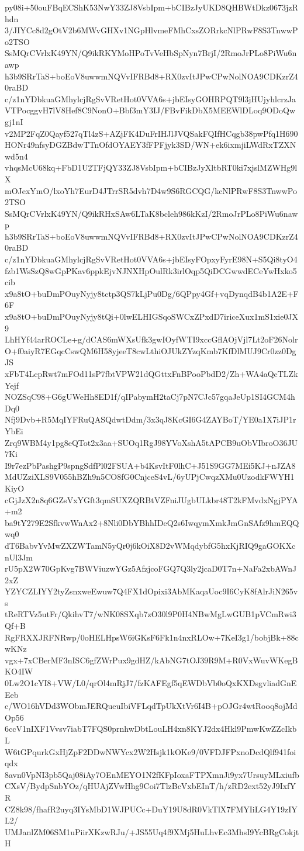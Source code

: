 py08i+50ouFBqECShK53NwY33ZJ8VsbIpm+bCIBzJyUKD8QHBWtDkz0673jzRhdn
3/JIYCc8d2gOtV2b6MWvGHXv1NGpHlvmeFMhCxsZORrkcNlPRwF8S3TnwwPo2TSO
SsMQrCVrlxK49YN/Q9ikRKYMoHPoTvVeHbSpNyn7BrjI/2RmoJrPLo8PiWu6nawp
h3b9SRrTaS+boEoV8uwwmNQVvIFRBd8+RX0zvItJPwCPwNolNOA9CDKzrZ40raBD
c/z1nYDbkuaGMhylcjRgSvVRetHot0VVA6s+jbEIsyGOHRPQT9l3jHUjyhlcrzJa
VTPocggvH7lV8Hef8C9NonO+Bbf3mY3IJ/FBvFikDbX5MEEWlDLoq9ODoQwgj1nI
v2MP2FqZ0Qayf527qTl4zS+AZjFK4DuFrIHJlJVQSakFQIfHCqgb38pwPfq1H690
HONr49nfsyDGZBdwTTnOfdOYAEY3fFPFjyk3SD/WN+ek6ixmjiLWdRxTZXNwd5n4
vhqsMcU68kq+FbD1U2TFjQY33ZJ8VsbIpm+bCIBzJyXltbRT0ki7xjslMZWHg9lX
mOJexYmO/lxoYh7EurD4JTrrSR5dvh7D4w9S6RGCQG/kcNlPRwF8S3TnwwPo2TSO
SsMQrCVrlxK49YN/Q9ikRHxSAw6LTaK8bcleh986kKzI/2RmoJrPLo8PiWu6nawp
h3b9SRrTaS+boEoV8uwwmNQVvIFRBd8+RX0zvItJPwCPwNolNOA9CDKzrZ40raBD
c/z1nYDbkuaGMhylcjRgSvVRetHot0VVA6s+jbEIsyFOpxyFyrE98N+S5Qi8tyO4
fzb1WsSzQ8wGpPKav6ppkEjvNJNXHpOulRk3irlOqp5QiDCGwwdECeYwHxko5cib
x9a8tO+buDmPOuyNyjy8tctp3QS7kLjPu0Dg/6QPpy4Gf+vqDynqdB4b1A2E+F6F
x9a8tO+buDmPOuyNyjy8tQi+0lwELHIGSqoSWCxZPxdD7iriceXux1mS1xie0JX9
LhHYf44arROCLe+g/dCAS6mWXsUfk3gwIOyfWTI9xccGflAOjVjl7Lt2oF26Nolr
O+f0aiyR7EGqcCswQM6H58yjeeT8cwLthiOJUkZYzqKmb7KfDlMUJ9Cr0zz0DgJS
xFbT4LcpRwt7mFOd11sP7fbtVPW21dQGttxFnBPooPbdD2/Zh+WA4aQcTLZkYejf
NOZSqC98+G6gUWeHh8ED1f/qIPabymH2taCj7pN7CJc57gqaJeUp1SI4GCM4hDq0
Nfj9Dvb+R5MqIYFRuQASQdwtDdm/3x3qJ8KcGI6G4ZAYBoT/YE0a1X7iJP1rYbEi
Zrq9WBM4y1pg8eQTot2x3aa+SUOq1RgJ98YVoXshA5tAPCB9uObVIbroO36JU7Ki
I9r7ezPbPashgP9spngSdfPl02FSUA+b4KsvItF0lhC+J51S9GG7MEi5KJ+nJZA8
MdUZziXLS9V055hBZh9n5CO8fG0CnjceS4vL/6yUPjCwqzXMu0UzodkFWYH1KiyO
cGjJzX2n8q6GZsVxYGft3qmSUXZQRBtVZFniJUgbULkbr48T2kFMvdxNgjPYA+m2
ba9tY279E2SfkvwWnAx2+8Nli0DbYBhhIDeQ2s6IwqymXmkJmGnSAfz9hmEQQwq0
dT6BabvYvMwZXZWTamN5yQr0j6kOiX8D2vWMqdybfG5hxKjRIQ9gaGOKXcnUl3Jm
rU5pX2W70GpKvg7BWViuzwYGz5AfzjcoFGQ7Q3ly2jcaD0T7n+NaFa2xbAWnJ2xZ
YZYCZLIYY2tyZsnxweEwuw7Q4FX1dOpixi3AbMKaqaUoc9I6CyK8fAlrJiN265vs
tReRTVz5utFr/QkihvT7/wNK08SXqb7zO30l9P0H4NBwMgLwGUB1pVCmRwi3Qf+B
RgFRXXJRFNRwp/0oHELHpsW6iGKsF6Fk1n4nxRLOw+7KeI3g1/bobjBk+88cwKNz
vgx+7xCBerMF3nISC6gfZWrPux9gdHZ/kAbNG7tOJ39R9M+R0VxWuvWKegBKO4IW
0Lw2O1cYI8+VW/L0/qrOl4mRjJ7/fzKAFEgf5qEWDbVb0oQxKXDsgvliadGnEEeb
c/WO16hVDd3WObmJERQueuIbiVFLqdTpUkXtVr6I4B+pOJGr4wtRooq8ojMdOp56
6ccV1nIXF1Vvsv7iabT7FQS0prnhwDbtLouLH4xn8KYJ2dx4Hkl9PmwKwZZcIkbL
W6tGPqurkGxHjZpF2DDwNWYcx2W2Hsjk1kOKe9/0VFDJFPxnoDcdQlf941foiqdx
8avn0VpNI3pb5Qaj08iAy7OEnMEYO1N2fKFpIoxaFTPXmnJi9yx7UrsuyMLxiufb
CXsV/BydpSnbYOz/qHUAjZVwHhg9Coi7TlzBcVxbEInT/h/zRD2ext52yJ9IxfYR
CZ8k98/fhafR2uyq3IYsMbD1WJPUCc+DuY19U8dR0VkTlX7FMYIiLG4Y19zIYL2/
UMJanlZM06SM1uPiirXKzwRJu/+JS55Uq4f9XMj5HuLhvEc3MhsI9YcBRgCokjtH
